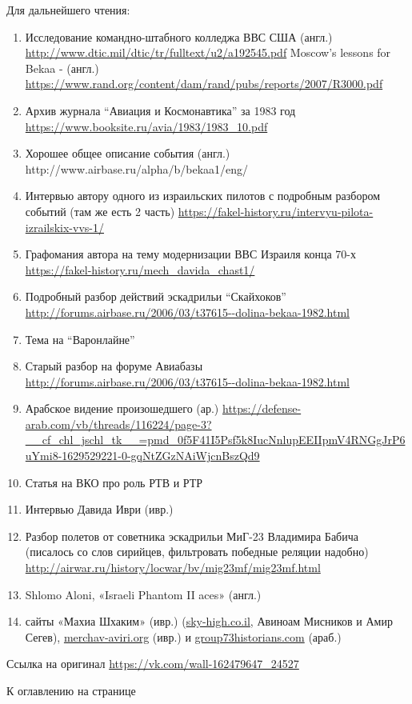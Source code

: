 Для дальнейшего чтения:
\begin{enumerate}
	\item  Исследование командно-штабного колледжа ВВС США (англ.) \url{http://www.dtic.mil/dtic/tr/fulltext/u2/a192545.pdf}
Moscow’s lessons for Bekaa - (англ.) \url{https://www.rand.org/content/dam/rand/pubs/reports/2007/R3000.pdf}
\item Архив журнала “Авиация и Космонавтика” за 1983 год \url{https://www.booksite.ru/avia/1983/1983_10.pdf}
\item Хорошее общее описание события (англ.) http://www.airbase.ru/alpha/b/bekaa1/eng/
\item Интервью автору одного из израильских пилотов с подробным разбором событий (там же есть 2 часть) \url{https://fakel-history.ru/intervyu-pilota-izrailskix-vvs-1/}
\item Графомания автора на тему модернизации ВВС Израиля конца 70-х
\url{https://fakel-history.ru/mech_davida_chast1/}
\item Подробный разбор действий эскадрильи “Скайхоков” \url{http://forums.airbase.ru/2006/03/t37615--dolina-bekaa-1982.html}
\item Тема на “Варонлайне”
\item Старый разбор на форуме Авиабазы \url{http://forums.airbase.ru/2006/03/t37615--dolina-bekaa-1982.html}
\item Арабское видение произошедшего (ар.) \url{https://defense-arab.com/vb/threads/116224/page-3?__cf_chl_jschl_tk__=pmd_0f5F41I5Psf5k8IucNnlupEEIIpmV4RNGgJrP6uYmi8-1629529221-0-gqNtZGzNAiWjcnBszQd9}
\item Статья на ВКО про роль РТВ и РТР 
\item Интервью Давида Иври (ивр.) 
\item Разбор полетов от советника эскадрильи МиГ-23 Владимира Бабича (писалось со слов сирийцев, фильтровать победные реляции надобно) \url{http://airwar.ru/history/locwar/bv/mig23mf/mig23mf.html}
\item Shlomo Aloni, «Israeli Phantom II aces» (англ.)

\item сайты «Махиа Шхаким» (ивр.) (\url{sky-high.co.il}, Авиноам Мисников и Амир Сегев), \url{merchav-aviri.org} (ивр.) и \url{group73historians.com} (араб.)
\end{enumerate}

Ссылка на оригинал \url{https://vk.com/wall-162479647_24527}

К оглавлению на странице \pageref{tablecont}